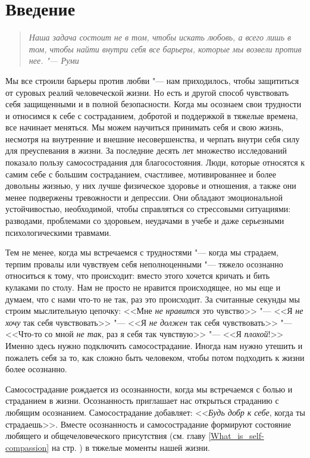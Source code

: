 
\section*{Введение} \label{Introduction}

\begin{quote}
	\textit{Наша задача состоит не в том, чтобы искать любовь, а всего лишь в том, чтобы найти внутри себя все барьеры, которые мы возвели против нее. "--- Руми}
\end{quote}
	
	Мы все строили барьеры против любви "--- нам приходилось, чтобы защититься от суровых реалий человеческой жизни. Но есть и другой способ чувствовать себя защищенными и в полной безопасности. Когда мы осознаем свои трудности и относимся к себе с состраданием, добротой и поддержкой в тяжелые времена, все начинает меняться. Мы можем научиться принимать себя и свою жизнь, несмотря на внутренние и внешние несовершенства, и черпать внутри себя силу для преуспевания в жизни. За последние десять лет множество исследований показало пользу самосострадания для благосостояния. Люди, которые относятся к самим себе с большим состраданием, счастливее, мотивированнее и более довольны жизнью, у них лучше физическое здоровье и отношения, а также они менее подвержены тревожности и депрессии. Они обладают эмоциональной устойчивостью, необходимой, чтобы справляться со стрессовыми ситуациями: разводами, проблемами со здоровьем, неудачами в учебе и даже серьезными психологическими травмами. 
	
	Тем не менее, когда мы встречаемся с трудностями "--- когда мы страдаем, терпим провалы или чувствуем себя неполноценными "--- тяжело осознанно относиться к тому, что происходит: вместо этого хочется кричать и бить кулаками по столу. Нам не просто не нравится происходящее, но мы еще и думаем, что с нами что-то не так, раз это происходит. За считанные секунды мы строим мыслительную цепочку: <<Мне \emph{не нравится} это чувство>> "--- <<Я \emph{не хочу} так себя чувствовать>> "--- <<Я \emph{не должен} так себя чувствовать>> "--- <<Что-то со мной \emph{не так}, раз я себя так чувствую>> "--- <<Я \emph{плохой}!>> Именно здесь нужно подключить самосострадание. Иногда нам нужно утешить и пожалеть себя за то, как сложно быть человеком, чтобы потом подходить к жизни более осознанно. 
	
	Самосострадание рождается из осознанности, когда мы встречаемся с болью и страданием в жизни. Осознанность приглашает нас открыться страданию с любящим осознанием. Самосострадание добавляет: <<\emph{Будь добр к себе}, когда ты страдаешь>>. Вместе осознанность и самосострадание формируют состояние любящего и общечеловеческого присутствия (см. главу \ref{What_is_self-compassion} на стр. \pageref{What_is_self-compassion}) в тяжелые моменты нашей жизни. 
	
